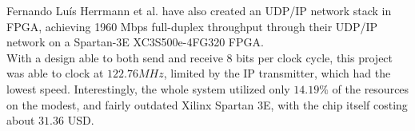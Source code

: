 Fernando Lu{\'i}s Herrmann et al. have also created an UDP/IP network stack
in FPGA, achieving 1960 Mbps full-duplex throughput through their UDP/IP
network on a Spartan-3E XC3S500e-4FG320 FPGA\cite{Herrmann2009ANU}.\\
With a design able to both send and receive 8 bits per clock cycle, this
project was able to clock at $122.76 MHz$, limited by the IP transmitter, which
had the lowest speed. Interestingly, the whole system utilized only $14.19\%$
of the resources on the modest, and fairly outdated Xilinx Spartan 3E, with the
chip itself costing about $31.36$ USD\cite{XC3S500E}.





